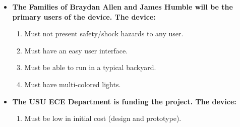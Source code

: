 \begin{itemize}
\begin{enumerate}
%		
%		
%		
%
%		
		
	\end{enumerate}
	
	\item {\textbf{The Families of Braydan Allen and James Humble will be the primary users of the device. The device:}}
	\begin{enumerate}
		\item Must not present safety/shock hazards to any user.
		\item Must have an easy user interface.
		\item Must be able to run in a typical backyard.
		\item Must have multi-colored lights. 
	\end{enumerate}
	
	\item {\textbf{The USU ECE Department is funding the project.  The device:}}
	\begin{enumerate}
		\item Must be low in initial cost (design and prototype).\\[.5cm] 
		
%
%		
		

\end{enumerate}
\end{itemize}
